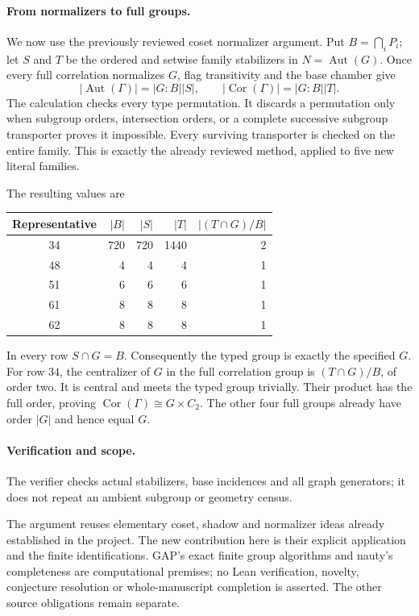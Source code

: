 \documentclass[11pt]{article}
\newcommand{\Aut}{\operatorname{Aut}}\newcommand{\Cor}{\operatorname{Cor}}
\begin{document}
\paragraph{From normalizers to full groups.}
We now use the previously reviewed coset normalizer argument. Put
$B=\bigcap_iP_i$; let $S$ and $T$ be the ordered and setwise family
stabilizers in $N=\Aut(G)$. Once every full correlation normalizes $G$,
flag transitivity and the base chamber give
\[
 |\Aut(\Gamma)|=|G:B||S|,\qquad
 |\Cor(\Gamma)|=|G:B||T|.
\]
The calculation checks every type permutation. It discards a permutation
only when subgroup orders, intersection orders, or a complete successive
subgroup transporter proves it impossible. Every surviving transporter
is checked on the entire family. This is exactly the already reviewed
method, applied to five new literal families.

The resulting values are
\begin{center}
\begin{tabular}{crrrr}\toprule
Representative&$|B|$&$|S|$&$|T|$&$|(T\cap G)/B|$\\\midrule
34&720&720&1440&2\\
48&4&4&4&1\\
51&6&6&6&1\\
61&8&8&8&1\\
62&8&8&8&1\\\bottomrule
\end{tabular}
\end{center}
In every row $S\cap G=B$. Consequently the typed group is exactly
the specified $G$. For row $34$, the centralizer of $G$ in the full
correlation group is $(T\cap G)/B$, of order two. It is central and
meets the typed group trivially. Their product has the full order,
proving $\Cor(\Gamma)\cong G\times C_2$. The other four full groups
already have order $|G|$ and hence equal $G$.

\paragraph{Verification and scope.}
The verifier checks actual stabilizers, base incidences and all graph
generators; it does not repeat an ambient subgroup or geometry census.


The argument reuses elementary coset, shadow and normalizer ideas already
established in the project. The new contribution here is their explicit
application and the finite identifications. GAP's exact finite group
algorithms and nauty's completeness are computational premises; no Lean
verification, novelty, conjecture resolution or whole-manuscript
completion is asserted. The other source obligations remain separate.
\end{document}
